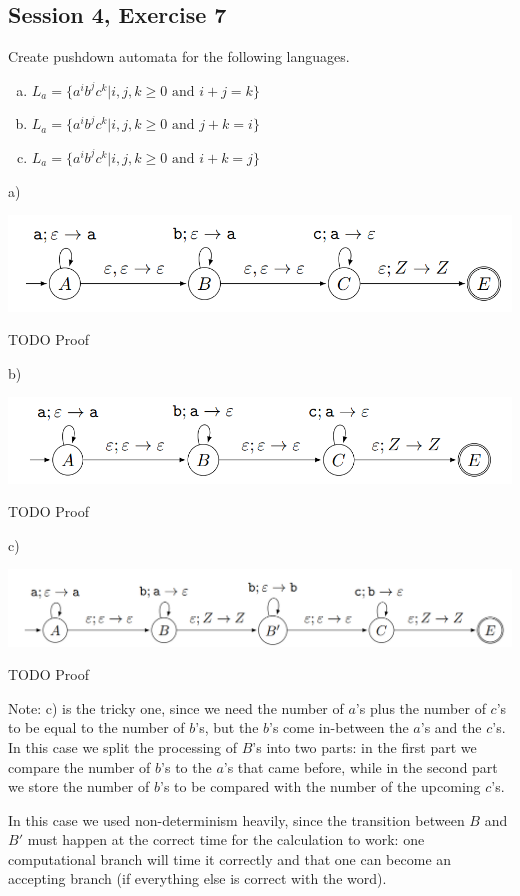 \subsection{Session 4, Exercise 7}

\label{4_7}


Create pushdown automata for the following languages.
\begin{enumerate}[a)]
    \item $L_a = \{a^ib^jc^k | i,j,k \geq{} 0\text{ and }i+j = k\}$
    \item $L_a = \{a^ib^jc^k | i,j,k \geq{} 0\text{ and }j+k = i\}$
    \item $L_a = \{a^ib^jc^k | i,j,k \geq{} 0\text{ and }i+k = j\}$
\end{enumerate}



a)

\includegraphics[width=\linewidth]{04/4_7_a.png}

TODO Proof

b)

\includegraphics[width=\linewidth]{04/4_7_b.png}

TODO Proof

c)

\includegraphics[width=\linewidth]{04/4_7_c.png}

TODO Proof

Note: c) is the tricky one, since we need the number of $a$'s plus the number of $c$'s to be equal to the number of $b$'s, but the $b$'s come in-between the $a$'s and the $c$'s. In this case we split the processing of $B$'s into two parts: in the first part we compare the number of $b$'s to the $a$'s that came before, while in the second part we store the number of $b$'s to be compared with the number of the upcoming $c$'s.

In this case we used non-determinism heavily, since the transition between $B$ and $B'$ must happen at the correct time for the calculation to work: one computational branch will time it correctly and that one can become an accepting branch (if everything else is correct with the word).